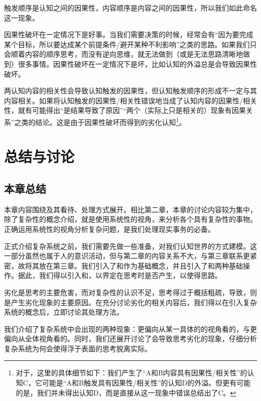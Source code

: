 \begin{explain}
触发顺序是认知之间的因果性，内容顺序是内容之间的因果性，所以我们如此命名这一现象。

因果性破坏在一定情况下是好事。当我们需要决策的时候，经常会有“因为要完成某个目标，所以要达成某个前提条件/避开某种不利影响”之类的思路。如果我们只会顺着内容的顺序思考，而没有逆向思维，就无法做到（或是无法思路清晰地做到）很多事情。因果性破坏在一定情况下是坏，比如认知的外溢总是会导致因果性破坏。

两认知内容的相关性会导致认知触发的因果性，但认知触发顺序的形成不一定与其内容相关。如果将认知触发的因果性/相关性错误地当成了认知内容的因果性/相关性，就有可能得出“是结果导致了原因”“两个（实际上只是相关的）现象有因果关系”之类的结论。这是由于因果性破坏而得到的劣化认知\footnote{对于\rigorous，这里的具体细节如下：我们产生了“A和B内容具有因果性/相关性”的认知C，它可能是“A和B触发具有因果性/相关性”的认知D的外溢。但更有可能的是，我们并未得出认知D，而是直接从这一现象中错误总结出了C。}。
\end{explain} 

\section{总结与讨论}
\subsection{本章总结}
本章内容围绕及其看待、处理方式展开。相比第二章，本章的讨论内容较为集中，除了复杂性的概念介绍，就是使用系统性的视角，来分析各个具有复杂性的事物。正确运用系统性的视角分析复杂问题，是我们处理现实事务的必备。

正式介绍复杂系统之前，我们需要先做一些准备，对我们认知世界的方式建模。这一部分虽然也属于人的意识活动，但与第二章的内容关系不大，与第三章联系更紧密，故将其放在第三章。我们引入了和作为基础概念，并且引入了和两种基础操作。据此，我们得以引入和，以界定在思考时是否产生，以使得思路。

劣化是思考的主要危害，而对复杂性的认识不足，思考得过于概括粗疏，导致，则是产生劣化现象的主要原因。在充分讨论劣化的相关内容后，我们得以在引入复杂系统的概念后，立即讨论其处理方法。

我们介绍了复杂系统中会出现的两种现象：更偏向从某一具体的的视角看的，与更偏向从全体视角看的。同时，我们还展开讨论了会导致思考劣化的现象，仔细分析复杂系统为何会使得浮于表面的思考脱离实际。


